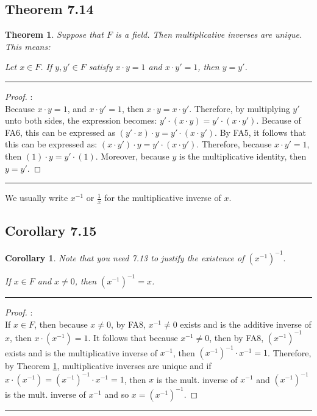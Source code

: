 \documentclass[openany, amssymb, psamsfonts]{amsart}
\newtheorem{thm}{Theorem}[section]
\newtheorem{cor}{Corollary}[section]
\theoremstyle{definition}
\numberwithin{equation}{section}
\begin{document}
\subsection*{Theorem 7.14}
\begin{thm}
\label{7.14}
Suppose that $F$ is a field.  Then multiplicative inverses are unique.  This means: 
	
Let $x \in F$.  If $y, y' \in F$ satisfy $x \cdot y = 1$ and $x \cdot y' = 1$, then $y = y'$.
\end{thm}
\vspace{4pt}     \hrule   \vspace{4pt}
\begin{proof}:\\
Because $x\cdot y =1$, and $x\cdot y' =1$, then $x\cdot y = x\cdot y'$. Therefore, by multiplying $y'$ unto both sides, the expression becomes: $y'\cdot (x\cdot y) = y' \cdot (x\cdot y')$. Because of FA6, this can be expressed as $(y'\cdot x) \cdot y = y' \cdot (x\cdot y')$. By FA5, it follows that this can be expressed as: $(x\cdot y') \cdot y = y' \cdot (x\cdot y')$. Therefore, because $x\cdot y' =1$, then $(1) \cdot y = y' \cdot (1)$. Moreover, because $y$ is the multiplicative identity, then $y=y'$.
\end{proof}		
\vspace{4pt}     \hrule   \vspace{4pt}

We usually write $x^{-1}$ or $\frac{1}{x}$ for the multiplicative inverse of $x$.

\subsection*{Corollary 7.15}
\begin{cor} { Note that you need 7.13 to justify the existence of $(x^{-1})^{-1}.$}
\label{7.15}

	If $x\in F$ and $x\neq 0$, then $(x^{-1})^{-1}=x$.
\end{cor}
\vspace{4pt}     \hrule   \vspace{4pt}
\begin{proof}:\\
If $x\in F$, then because $x\neq 0$, by FA8, $x^{-1}\neq 0$ exists and is the additive inverse of $x$, then $x\cdot (x^{-1}) =1$. It follows that because $x^{-1}\neq 0$, then by FA8, $(x^{-1})^{-1}$ exists and is the multiplicative inverse of $x^{-1}$, then $(x^{-1})^{-1} \cdot x^{-1}= 1$.  Therefore, by Theorem \ref{7.14}, multiplicative inverses are unique and if $x\cdot(x^{-1}) = (x^{-1})^{-1} \cdot  x^{-1}= 1$, then $x$ is the mult. inverse of $x^{-1}$ and $(x^{-1})^{-1}$ is the mult. inverse of $x^{-1}$ and so $x = (x^{-1})^{-1}$.
\end{proof}		
\vspace{4pt}     \hrule   \vspace{4pt}
\end{document}
